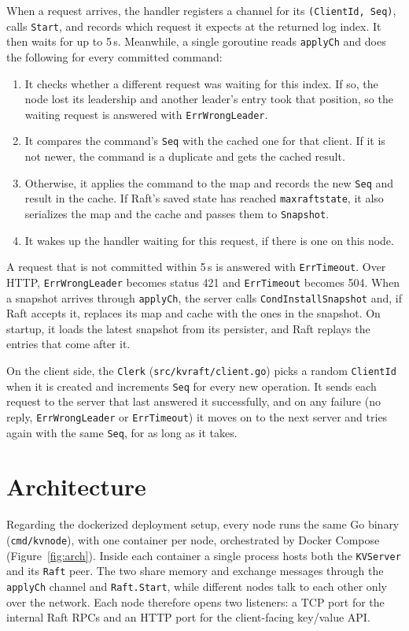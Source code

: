 \documentclass[conference]{IEEEtran}
\begin{document}
When a request arrives, the handler registers a channel for its \texttt{(ClientId, Seq)}, calls \texttt{Start}, and records which request it expects at the returned log index. It then waits for up to 5\,s. Meanwhile, a single goroutine reads \texttt{applyCh} and does the following for every committed command:
\begin{enumerate}
\item It checks whether a different request was waiting for this index. If so, the node lost its leadership and another leader's entry took that position, so the waiting request is answered with \texttt{ErrWrongLeader}.
\item It compares the command's \texttt{Seq} with the cached one for that client. If it is not newer, the command is a duplicate and gets the cached result.
\item Otherwise, it applies the command to the map and records the new \texttt{Seq} and result in the cache. If Raft's saved state has reached \texttt{maxraftstate}, it also serializes the map and the cache and passes them to \texttt{Snapshot}.
\item It wakes up the handler waiting for this request, if there is one on this node.
\end{enumerate}
A request that is not committed within 5\,s is answered with \texttt{ErrTimeout}. Over HTTP, \texttt{ErrWrongLeader} becomes status 421 and \texttt{ErrTimeout} becomes 504. When a snapshot arrives through \texttt{applyCh}, the server calls \texttt{CondInstallSnapshot} and, if Raft accepts it, replaces its map and cache with the ones in the snapshot. On startup, it loads the latest snapshot from its persister, and Raft replays the entries that come after it.

On the client side, the \texttt{Clerk} (\texttt{src/kvraft/client.go}) picks a random \texttt{ClientId} when it is created and increments \texttt{Seq} for every new operation. It sends each request to the server that last answered it successfully, and on any failure (no reply, \texttt{ErrWrongLeader} or \texttt{ErrTimeout}) it moves on to the next server and tries again with the same \texttt{Seq}, for as long as it takes.

\section{Architecture}
\label{sec:arch}
Regarding the dockerized deployment setup, every node runs the same Go binary (\texttt{cmd/kvnode}), with one container per node, orchestrated by Docker Compose (Figure~\ref{fig:arch}).  Inside each container a single process hosts both the \texttt{KVServer} and its \texttt{Raft} peer. The two share memory and exchange messages through the \texttt{applyCh} channel and \texttt{Raft.Start}, while different nodes talk to each other only over the network. Each node therefore opens two listeners: a TCP port for the internal Raft RPCs and an HTTP port for the client-facing key/value API.
\end{document}
